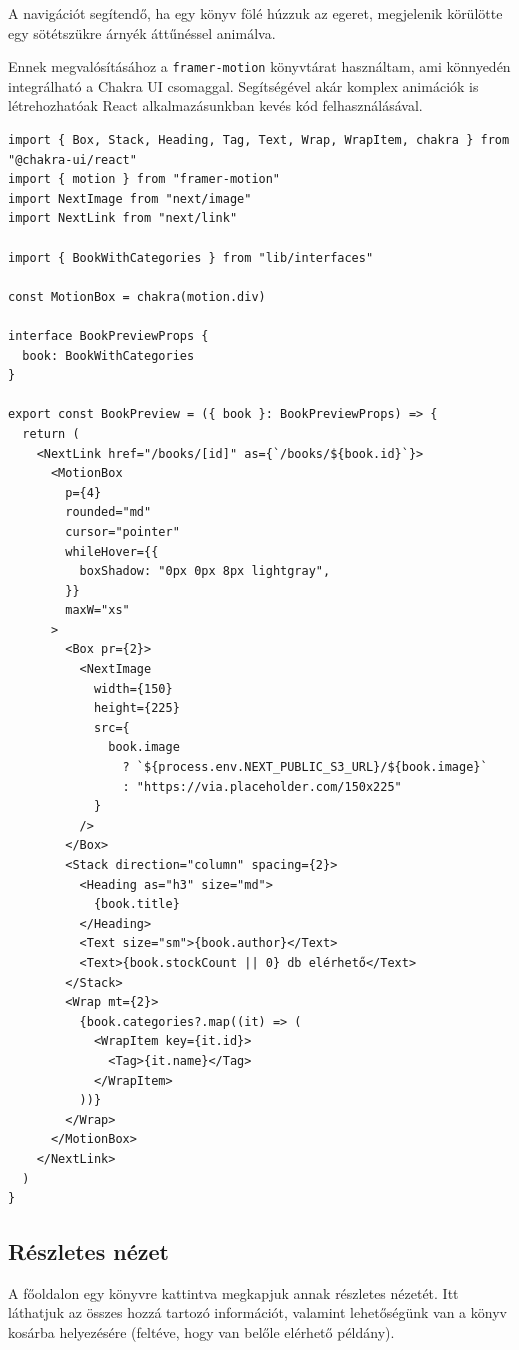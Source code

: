 A navigációt segítendő, ha egy könyv fölé húzzuk az egeret, megjelenik körülötte egy sötétszükre árnyék áttűnéssel animálva.

Ennek megvalósításához a \lstinline|framer-motion| könyvtárat használtam, ami könnyedén integrálható a Chakra UI csomaggal.
Segítségével akár komplex animációk is létrehozhatóak React alkalmazásunkban kevés kód felhasználásával.

\begin{lstlisting}[caption=framer-motion és Chakra UI együttes használata]
import { Box, Stack, Heading, Tag, Text, Wrap, WrapItem, chakra } from "@chakra-ui/react"
import { motion } from "framer-motion"
import NextImage from "next/image"
import NextLink from "next/link"

import { BookWithCategories } from "lib/interfaces"

const MotionBox = chakra(motion.div)

interface BookPreviewProps {
  book: BookWithCategories
}

export const BookPreview = ({ book }: BookPreviewProps) => {
  return (
    <NextLink href="/books/[id]" as={`/books/${book.id}`}>
      <MotionBox
        p={4}
        rounded="md"
        cursor="pointer"
        whileHover={{
          boxShadow: "0px 0px 8px lightgray",
        }}
        maxW="xs"
      >
        <Box pr={2}>
          <NextImage
            width={150}
            height={225}
            src={
              book.image
                ? `${process.env.NEXT_PUBLIC_S3_URL}/${book.image}`
                : "https://via.placeholder.com/150x225"
            }
          />
        </Box>
        <Stack direction="column" spacing={2}>
          <Heading as="h3" size="md">
            {book.title}
          </Heading>
          <Text size="sm">{book.author}</Text>
          <Text>{book.stockCount || 0} db elérhető</Text>
        </Stack>
        <Wrap mt={2}>
          {book.categories?.map((it) => (
            <WrapItem key={it.id}>
              <Tag>{it.name}</Tag>
            </WrapItem>
          ))}
        </Wrap>
      </MotionBox>
    </NextLink>
  )
}

\end{lstlisting}

\subsection{Részletes nézet}

A főoldalon egy könyvre kattintva megkapjuk annak részletes nézetét. Itt láthatjuk az összes hozzá tartozó információt, valamint
lehetőségünk van a könyv kosárba helyezésére (feltéve, hogy van belőle elérhető példány).

